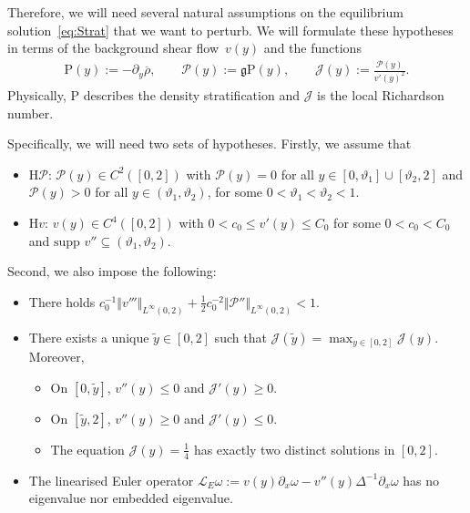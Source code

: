 \documentclass[11pt,reqno]{amsproc}
\theoremstyle{definition}
\numberwithin{equation}{section}
\renewcommand{\L}{{\mathcal{L}}}
\newcommand{\cJ}{{\mathcal{J}}}
\newcommand{\D}{{\Delta}}
\newcommand{\g}{{\mathfrak{g}}}
\renewcommand{\P}{{\mathcal{P}}}
\newcommand{\p}{\partial}
\begin{document}
Therefore, we will need several natural assumptions on the equilibrium solution~\eqref{eq:Strat} that we want to perturb. We will formulate these hypotheses in terms of the background shear flow~$v(y)$ and the functions
\begin{align*}
\mathrm{P}(y) := -\partial_y\overline{\rho}, \qquad \P(y) := \g \mathrm{P}(y),\qquad \cJ(y) := \frac{\P(y)}{v'(y)^2}.
\end{align*}
Physically, $\mathrm{P}$ describes the density stratification and $\cJ$ is the local Richardson number.

Specifically, we will need two sets of hypotheses. Firstly, we assume that 
\begin{itemize}
\item H$\P$: $\P(y) \in C^2([0,2])$ with $\P(y)=0$ for all $y\in[0,\vartheta_1]\cup [\vartheta_2,2]$ and  $\P(y)>0$  for all $y\in(\vartheta_1,\vartheta_2)$, for some $0 < \vartheta_1 < \vartheta_2 < 1$.
\item H$v$: $v(y)\in C^4([0,2])$ with $0<c_0\leq v'(y) \leq C_0$ for some $0<c_0<C_0$ and $\text{supp }v'' \subseteq (\vartheta_1, \vartheta_2)$.
\end{itemize}
Second, we also impose the following:
\begin{itemize}
\item[H1] There holds $c_0^{-1}\Vert v''' \Vert_{L^\infty(0,2)} + \frac12 c_0^{-2}\Vert \P'' \Vert_{L^\infty (0,2)}< 1$. 
\item[H2] There exists a unique $\tilde{y}\in [0,2]$ such that ${\cJ}(\tilde{y}) = \max_{y\in[0,2]}{\cJ}(y)$. Moreover,
\begin{itemize}
\item[H2.1] On $[0,\tilde{y}]$,  $v''(y) \leq 0$ and $\cJ'(y) \geq 0$.
\item[H2.2] On $[\tilde{y},2]$,  $v''(y) \geq 0$ and $\cJ'(y) \leq 0$.
\item[H2.3] The equation $\cJ(y) = \frac14$ has exactly two distinct solutions in $[0,2]$.
\end{itemize}
\item [H3] The linearised Euler operator $\L_E\omega:=v(y)\p_x\omega - v''(y)\D^{-1}\p_x\omega$ has no eigenvalue nor embedded eigenvalue.
\end{itemize}
\end{document}
